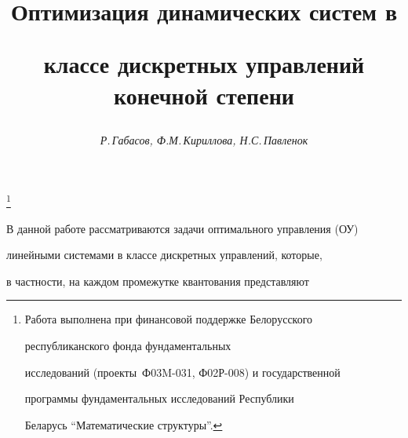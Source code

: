 \setcounter{page}{3}















\author{\it Р.\,Габасов, Ф.М.\,Кириллова, Н.С.\,Павленок}




\title{Оптимизация динамических систем в


классе дискретных управлений конечной степени}


\thanks{Работа выполнена при финансовой поддержке Белорусского


республиканского фонда фундаментальных


исследований (проекты \No\No\,Ф03M-031, Ф02Р-008) и государственной


программы фундаментальных исследований Республики


Беларусь ``Математические структуры''.}





\date{}




\pagestyle{plain} %







\maketitle


\label{begin}











В данной работе рассматриваются задачи оптимального управления (ОУ) 


линейными системами в классе дискретных управлений, которые,


в частности, на каждом промежутке квантования представляют


